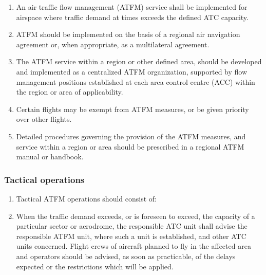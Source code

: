\begin{enumerate}
    \item An air traffic flow management (ATFM) service shall be implemented for airspace where traffic demand at times exceeds the defined ATC capacity.
    \item ATFM should be implemented on the basis of a regional air navigation agreement or, when appropriate, as a multilateral agreement.
    \item The ATFM service within a region or other defined area, should be developed and implemented as a centralized ATFM organization, supported by flow management positions established at each area control centre (ACC) within the region or area of applicability.
    \item Certain flights may be exempt from ATFM measures, or be given priority over other flights.
    \item Detailed procedures governing the provision of the ATFM measures, and service within a region or area should be prescribed in a regional ATFM manual or handbook.
\end{enumerate}

\addtocounter{subsubsection}{3}

\subsubsection{Tactical operations}

\begin{enumerate}
    \item Tactical ATFM operations should consist of:

    \item When the traffic demand exceeds, or is foreseen to exceed, the capacity of a particular sector or aerodrome, the responsible ATC unit shall advise the responsible ATFM unit, where such a unit is established, and other ATC units concerned. Flight crews of aircraft planned to fly in the affected area and operators should be advised, as soon as practicable, of the delays expected or the restrictions which will be applied.
\end{enumerate}


\chapterend